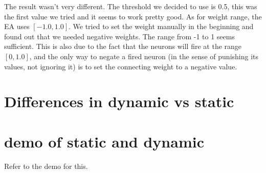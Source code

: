 \documentclass[12pt, a4paper]{article}
\begin{document}
The result wasn't very different.
The threshold we decided to use is 0.5, this was the first value we tried and it seems to work pretty good. As for weight range, the EA uses $[-1.0, 1.0]$. We tried to set the weight manually in the beginning and found out that we needed negative weights. The range from -1 to 1 seems sufficient. This is also due to the fact that the neurons will fire at the range $[0,1.0]$, and the only way to negate a fired neuron (in the sense of punishing its values, not ignoring it) is to set the connecting weight to a negative value.

\section{Differences in dynamic vs static}

\section{demo of static and dynamic}
Refer to the demo for this.
\end{document}
